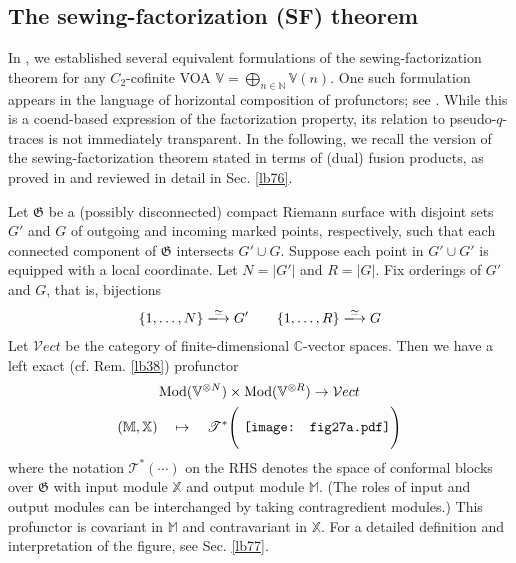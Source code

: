 \documentclass[11pt,b5paper,notitlepage]{article}
\theoremstyle{definition}
\theoremstyle{plain}
\newcommand{\Vect}{\mathcal Vect}
\newcommand{\Vbb}{\mathbb V}
\newcommand{\Xbb}{\mathbb X}
\newcommand{\Mbb}{\mathbb M}
\newcommand{\Cbb}{\mathbb C}
\newcommand{\Nbb}{\mathbb N}
\newcommand{\<}{\left\langle}
\renewcommand{\>}{\right\rangle}
\newcommand{\ST}{\mathscr{T}}
\newcommand{\Mod}{\mathrm{Mod}}
\newcommand{\fg}{\mathfrak{G}}
\numberwithin{equation}{section}
\begin{document}
\subsection{The sewing-factorization (SF) theorem}


In \cite{GZ3}, we established several equivalent formulations of the sewing-factorization theorem for any $C_2$-cofinite VOA $\Vbb=\bigoplus_{n\in\Nbb}\Vbb(n)$. One such formulation appears in the language of horizontal composition of profunctors; see \cite[Sec. 3.2]{GZ3}. While this is a coend-based expression of the factorization property, its relation to pseudo-$q$-traces is not immediately transparent. In the following, we recall the version of the sewing-factorization theorem stated in terms of (dual) fusion products, as proved in \cite[Sec. 3.1]{GZ3} and reviewed in detail in Sec. \ref{lb76}.

Let $\fg$ be a (possibly disconnected) compact Riemann surface with disjoint sets $G'$ and $G$ of outgoing and incoming marked points, respectively, such that each connected component of $\fg$ intersects $G'\cup G$. Suppose each point in $G'\cup G'$ is equipped with a local coordinate. Let $N = |G'|$ and $R = |G|$. Fix orderings of $G'$ and $G$, that is, bijections
\begin{align*}
\{1,\dots,N\}\xlongrightarrow{\simeq}G'\qquad \{1,\dots,R\}\xlongrightarrow{\simeq}G
\end{align*}
Let $\Vect$ be the category of finite-dimensional $\Cbb$-vector spaces. Then we have a left exact (cf. Rem. \ref{lb38}) profunctor
\begin{gather*}
\Mod(\Vbb^{\otimes N})\times\Mod(\Vbb^{\otimes R})\rightarrow\Vect\\
(\Mbb,\Xbb)\quad\mapsto\quad\ST^*\Bigg(\vcenter{\hbox{{
		\texttt{[image: fig27a.pdf]}}}}\Bigg)
\end{gather*}
where the notation $\ST^*(\cdots)$ on the RHS denotes the space of conformal blocks over $\fg$ with input module $\Xbb$ and output module $\Mbb$. (The roles of input and output modules can be interchanged by taking contragredient modules.) This profunctor is covariant in $\Mbb$ and contravariant in $\Xbb$. For a detailed definition and interpretation of the figure, see Sec. \ref{lb77}.
\end{document}
